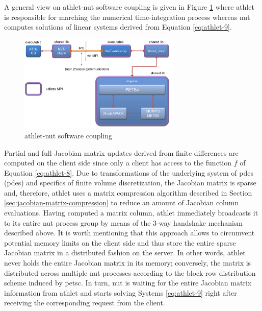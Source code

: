A general view on \acrshort{athlet}-\acrshort{nut} software coupling is given in Figure \ref{fig:introduction-athlet-nut-coupling} where  \acrshort{athlet} is responsible for marching the numerical time-integration process whereas \acrshort{nut} computes solutions of linear systems derived from Equation \ref{eq:athlet-9}.




\begin{figure}[!h]
  \centering
  \includegraphics[width=0.69\textwidth]{figures/introduction-athlet-nut-coupling.png}
    \caption{\acrshort{athlet}-\acrshort{nut} software coupling}
\label{fig:introduction-athlet-nut-coupling}
\end{figure}


Partial and full Jacobian matrix updates derived from finite differences are computed on the client side since only a client has access to the function $f$ of Equation \ref{eq:athlet-8}. Due to transformations of the underlying system of \acrlong{pde}s (\acrshort{pde}s) and specifics of finite volume discretization, the Jacobian matrix is sparse and, therefore, \acrshort{athlet} uses a matrix compression algorithm  described in Section \ref{sec:jacobian-matrix-compression} to reduce an amount of Jacobian column evaluations. Having computed a matrix column, \acrshort{athlet} immediately broadcasts it to its entire \acrshort{nut} process group by means of the 3-way handshake mechanism described above. It is worth mentioning that this approach allows to circumvent potential memory limits on the client side and thus store the entire sparse Jacobian matrix in a distributed fashion on the server. In other words, \acrshort{athlet} never holds the entire Jacobian matrix in its memory; conversely, the matrix is distributed across multiple \acrshort{nut} processes according to the block-row distribution scheme induced by \acrshort{petsc}. In turn, \acrshort{nut} is waiting for the entire Jacobian matrix information from \acrshort{athlet} and starts solving Systems \ref{eq:athlet-9} right after receiving the corresponding request from the client.\\